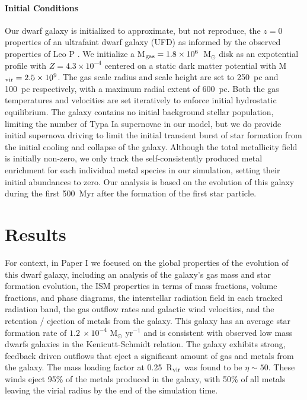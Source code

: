 \documentclass[twocolumn]{aastex61}
\begin{document}
\paragraph{Initial Conditions} Our dwarf galaxy is initialized to approximate, but not reproduce, the $z = 0$ properties of an ultrafaint dwarf galaxy (UFD) as informed by the observed properties of Leo P \citep[see ][]{Giovanelli2013,McQuinn2015a,McQuinn2015}. We initialize a M$_{\rm gas} = 1.8 \times 10^{6}$~M$_{\odot}$ disk as an expotential profile with $Z = 4.3 \times 10^{-4}$ centered on a static \cite{Burkert1995} dark matter potential with M$_{\rm vir} = 2.5 \times 10^{9}$. The gas scale radius and scale height are set to 250~pc and 100~pc respectively, with a maximum radial extent of 600~pc. Both the gas temperatures and velocities are set iteratively to enforce initial hydrostatic equilibrium. The galaxy contains no initial background stellar population, limiting the number of Typa Ia supernovae in our model, but we do provide initial supernova driving to limit the initial transient burst of star formation from the initial cooling and collapse of the galaxy. Although the total metallicity field is initially non-zero, we only track the self-consistently produced metal enrichment for each individual metal species in our simulation, setting their initial abundances to zero. Our analysis is based on the evolution of this galaxy during the first 500~Myr after the formation of the first star particle.

\section{Results}
For context, in Paper I we focused on the global properties of the evolution of this dwarf galaxy, including an analysis of the galaxy's gas mass and star formation evolution, the ISM properties in terms of mass fractions, volume fractions, and phase diagrams, the interstellar radiation field in each tracked radiation band, the gas outflow rates and galactic wind velocities, and the retention / ejection of metals from the galaxy. This galaxy has an average star formation rate of $1.2~\times 10^{-4}$ M$_{\odot}$ yr$^{-1}$ and is consistent with observed low mass dwarfs galaxies in the Kenicutt-Schmidt relation.  The galaxy exhibits strong, feedback driven outflows that eject a significant amount of gas and metals from the galaxy. The mass loading factor at 0.25~R$_{\rm vir}$ was found to be $\eta \sim 50$. These winds eject 95\% of the metals produced in the galaxy, with 50\% of all metals leaving the virial radius by the end of the simulation time.
\end{document}
